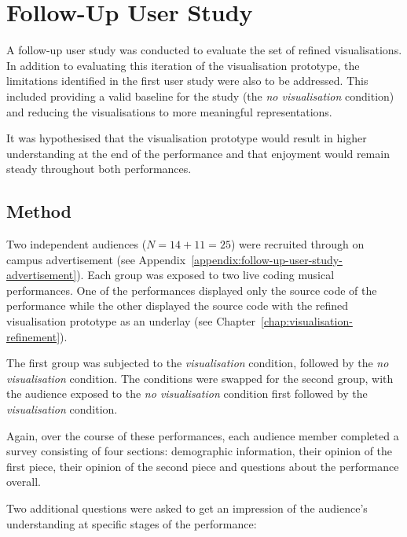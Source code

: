 
\chapter{Follow-Up User Study}
\label{chap:follow-up-user-study}

A follow-up user study was conducted to evaluate the set of refined visualisations. In addition to evaluating this iteration of the visualisation prototype, the limitations identified in the first user study were also to be addressed. This included providing a valid baseline for the study (the \emph{no visualisation} condition) and reducing the visualisations to more meaningful representations.


It was hypothesised that the visualisation prototype would result in higher understanding at the end of the performance and that enjoyment would remain steady throughout both performances.

\section{Method}

Two independent audiences ($N=14+11=25$) were recruited through on campus advertisement (see Appendix~\ref{appendix:follow-up-user-study-advertisement}). Each group was exposed to two live coding musical performances. One of the performances displayed only the source code of the performance while the other displayed the source code with the refined visualisation prototype as an underlay (see Chapter~\ref{chap:visualisation-refinement}).

The first group was subjected to the \emph{visualisation} condition, followed by the \emph{no visualisation} condition. The conditions were swapped for the second group, with the audience exposed to the \emph{no visualisation} condition first followed by the \emph{visualisation} condition.

Again, over the course of these performances, each audience member completed a survey consisting of four sections: demographic information, their opinion of the first piece, their opinion of the second piece and questions about the performance overall. 

Two additional questions were asked to get an impression of the audience's understanding at specific stages of the performance:

